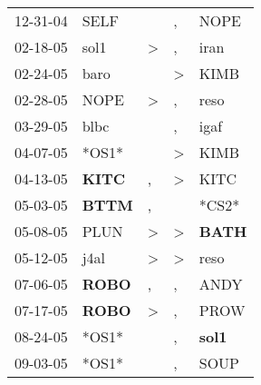\begin{supertabular}{p{0.07\textwidth}p{0.06\textwidth}p{0.02\textwidth}p{0.02\textwidth}p{0.06\textwidth}}
          12-31-04\textsuperscript{} &           SELF\textsuperscript{} &                  &                , &           NOPE\textsuperscript{} \\
          02-18-05\textsuperscript{} &           sol1\textsuperscript{} &     \textgreater &                , &           iran\textsuperscript{} \\
          02-24-05\textsuperscript{} &           baro\textsuperscript{} &                  &     \textgreater &           KIMB\textsuperscript{} \\
          02-28-05\textsuperscript{} &           NOPE\textsuperscript{} &     \textgreater &                , &           reso\textsuperscript{} \\
          03-29-05\textsuperscript{} &           blbc\textsuperscript{} &                  &                , &           igaf\textsuperscript{} \\
          04-07-05\textsuperscript{} &                            *OS1* &                  &     \textgreater &           KIMB\textsuperscript{} \\
          04-13-05\textsuperscript{} &  \textbf{KITC\textsuperscript{}} &                , &     \textgreater &           KITC\textsuperscript{} \\
          05-03-05\textsuperscript{} &  \textbf{BTTM\textsuperscript{}} &                , &                  &                            *CS2* \\
          05-08-05\textsuperscript{} &           PLUN\textsuperscript{} &     \textgreater &     \textgreater &  \textbf{BATH\textsuperscript{}} \\
          05-12-05\textsuperscript{} &           j4al\textsuperscript{} &     \textgreater &     \textgreater &           reso\textsuperscript{} \\
          07-06-05\textsuperscript{} &  \textbf{ROBO\textsuperscript{}} &                , &                , &           ANDY\textsuperscript{} \\
          07-17-05\textsuperscript{} &  \textbf{ROBO\textsuperscript{}} &     \textgreater &                , &           PROW\textsuperscript{} \\
          08-24-05\textsuperscript{} &                            *OS1* &                  &                , &  \textbf{sol1\textsuperscript{}} \\
          09-03-05\textsuperscript{} &                            *OS1* &                  &                , &           SOUP\textsuperscript{} \\

\end{supertabular}
